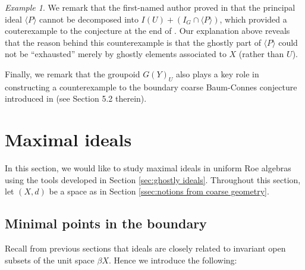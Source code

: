 \documentclass[12pt, a4paper]{amsart}
\numberwithin{equation}{section}
\newtheorem{prop}[thm]{Proposition}
\theoremstyle{definition}
\theoremstyle{remark}
\newtheorem{ex}[thm]{Example}
\begin{document}
\begin{ex}
We remark that the first-named author proved in \cite[Section 3]{Wan07} that the principal ideal $\langle P \rangle$ cannot be decomposed into $I(U) + (I_G\cap \langle P \rangle)$, which provided a couterexample to the conjecture at the end of \cite{CW04}. Our explanation above reveals that the reason behind this counterexample is that the ghostly part of $\langle P \rangle$ could not be ``exhausted'' merely by ghostly elements associated to $X$ (rather than $U$). 

Finally, we remark that the groupoid $G(Y)_U$ also plays a key role in constructing a counterexample to the boundary coarse Baum-Connes conjecture introduced in \cite{FW14} (see Section 5.2 therein).
\end{ex}





\section{Maximal ideals}\label{sec:maximal ideals}

In this section, we would like to study maximal ideals in uniform Roe algebras using the tools developed in Section \ref{sec:ghostly ideals}. Throughout this section, let $(X,d)$ be a space as in Section \ref{ssec:notions from coarse geometry}.

\subsection{Minimal points in the boundary}\label{ssec:min points}

Recall from previous sections that ideals are closely related to invariant open subsets of the unit space $\beta X$. Hence we introduce the following:
\end{document}
